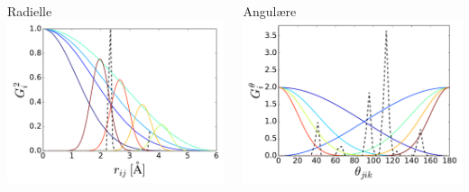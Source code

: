 \documentclass{beamer}
\begin{document}
\begin{frame}

\begin{columns} %
  \begin{column}{0.5\linewidth} %
   \centering
   Radielle
   \includegraphics[width=\linewidth]{../Figures/Presentation/SiInitialSymmG2.pdf}
  \end{column}
  \begin{column}{0.5\linewidth} %
   \centering
   Angulære
   \includegraphics[width=\linewidth]{../Figures/Presentation/SiInitialSymmG5.pdf}
  \end{column}
\end{columns}
 
\end{frame}
\end{document}
